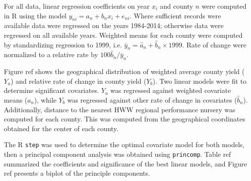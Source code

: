 \documentclass[paperwidth=42in,paperheight=44in]{baposter}
\begin{document}
\begin{poster}
{For all data, linear regression coefficients on year $x_i$ and county $n$ were computed in R using the model
$y_{n i} = a_{n} + b_{n} x_i + e_{n i}$. Where sufficient records were available data were regressed on the years 1984-2014; otherwise data were regressed on all available years. Weighted means for each county were computed by standardizing regression to 1999, i.e. $\bar{y}_{n} = \hat{a}_{n} + \hat{b}_{n} \times 1999$. Rate of change were normalized to a relative rate by $100 \hat{b}_{n} / \bar{y}_{n}$. 

Figure ref shows the geographical distribution of weighted average county yield ($Y_a$) and relative rate of change in county yield ($Y_b$).
Two linear models were fit to determine significant covariates. $Y_a$ was regressed against weighted covariate means ($\hat{a}_{n}$), while $Y_b$ was regressed against other rate of change in covariates ($\hat{b}_{n}$). Additionally, distance to the nearest HWW regional performance nursery was computed for each county. This was computed from the geographical coordinates obtained for the center of each county.

The R \verb|step| was used to determine the optimal covariate model for both models, then a principal component analysis was obtained using \verb|princomp|. Table ref summarized the coefficients and significance of the best linear models, and Figure ref presents a biplot of the principle components.


}
\end{poster}
\end{document}
